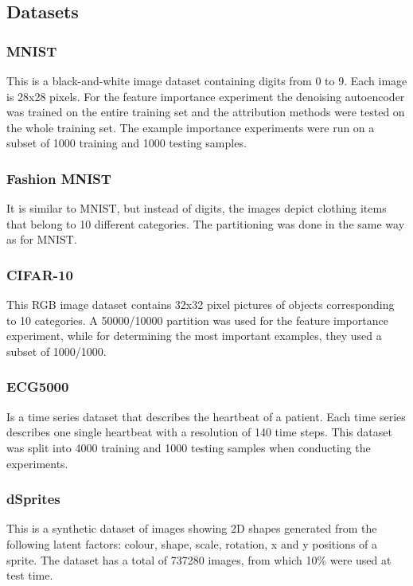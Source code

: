 \subsection{Datasets}
\label{appendix:datasets}
\subsubsection{MNIST} This is a black-and-white image dataset containing digits from 0 to 9. Each image is 28x28 pixels. For the feature importance experiment the denoising autoencoder was trained on the entire training set and the attribution methods were tested on the whole training set. The example importance experiments were run on a subset of 1000 training and 1000 testing samples. 

\subsubsection{Fashion MNIST} It is similar to MNIST, but instead of digits, the images depict clothing items that belong to 10 different categories. The partitioning was done in the same way as for MNIST.

\subsubsection{CIFAR-10} This RGB image dataset contains 32x32 pixel pictures of objects corresponding to 10 categories. A 50000/10000 partition was used for the feature importance experiment, while for determining the most important examples, they used a subset of 1000/1000.

\subsubsection{ECG5000} Is a time series dataset that describes the heartbeat of a patient. Each time series describes one single heartbeat with a resolution of 140 time steps. This dataset was split into 4000 training and 1000 testing samples when conducting the experiments.

\subsubsection{dSprites} This is a synthetic dataset of images showing 2D shapes generated from the following latent factors: colour, shape, scale, rotation, x and y positions of a sprite. The dataset has a total of 737280 images, from which 10\% were used at test time. 


